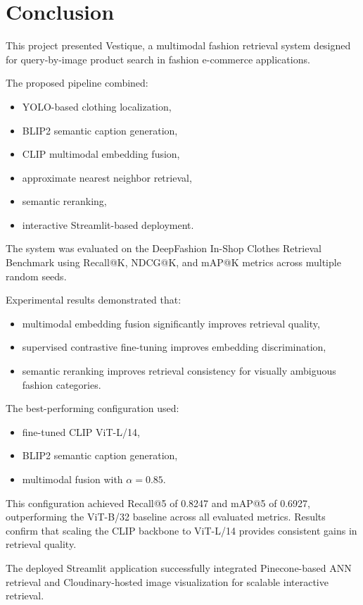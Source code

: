 \documentclass[11pt,a4paper]{article}
\begin{document}
\section{Conclusion}

This project presented Vestique, a multimodal fashion retrieval system designed for query-by-image product search in fashion e-commerce applications.

The proposed pipeline combined:
\begin{itemize}
    \item YOLO-based clothing localization,
    \item BLIP2 semantic caption generation,
    \item CLIP multimodal embedding fusion,
    \item approximate nearest neighbor retrieval,
    \item semantic reranking,
    \item interactive Streamlit-based deployment.
\end{itemize}

The system was evaluated on the DeepFashion In-Shop Clothes Retrieval Benchmark using Recall@K, NDCG@K, and mAP@K metrics across multiple random seeds.

Experimental results demonstrated that:
\begin{itemize}
    \item multimodal embedding fusion significantly improves retrieval quality,
    \item supervised contrastive fine-tuning improves embedding discrimination,
    \item semantic reranking improves retrieval consistency for visually ambiguous fashion categories.
\end{itemize}

The best-performing configuration used:
\begin{itemize}
    \item fine-tuned CLIP ViT-L/14,
    \item BLIP2 semantic caption generation,
    \item multimodal fusion with $\alpha = 0.85$.
\end{itemize}

This configuration achieved Recall@5 of 0.8247 and mAP@5 of 0.6927, outperforming the ViT-B/32 baseline across all evaluated metrics. Results confirm that scaling the CLIP backbone to ViT-L/14 provides consistent gains in retrieval quality.

The deployed Streamlit application successfully integrated Pinecone-based ANN retrieval and Cloudinary-hosted image visualization for scalable interactive retrieval.
\end{document}
